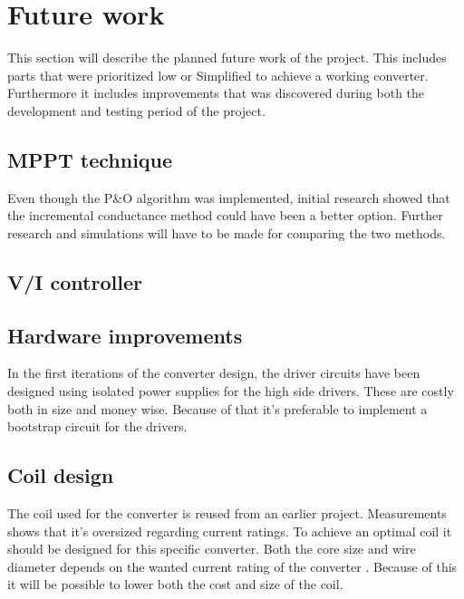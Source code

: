\section{Future work}
This section will describe the planned future work of the project. This includes parts that were prioritized low or Simplified to achieve a working converter. Furthermore it includes improvements that was discovered during both the development and testing period of the project.


\subsection{MPPT technique}
Even though the P\&O algorithm was implemented, initial research showed that the incremental conductance method could have been a better option.  Further research and simulations will have to be made for comparing the two methods. 

\subsection{V/I controller}


\subsection{Hardware improvements}
In the first iterations of the converter design, the driver circuits have been designed using isolated power supplies for the high side drivers. These are costly both in size and money wise. Because of that it's preferable to implement a bootstrap circuit for the drivers. 

\subsection{Coil design}
The coil used for the converter is reused from an earlier project. Measurements shows that it's oversized regarding current ratings. To achieve an optimal coil it should be designed for this specific converter. Both the core size and wire diameter depends on the wanted current rating of the converter \cite{underthehood}. Because of this it will be possible to lower both the cost and size of the coil. 


